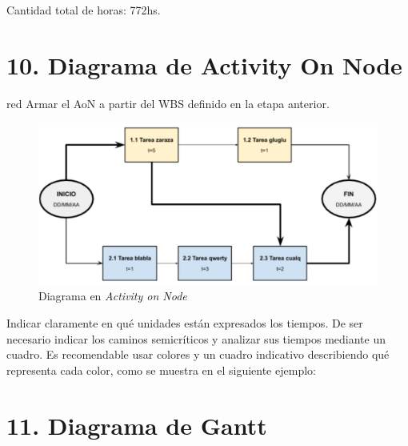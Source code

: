 \documentclass[
11pt, %
]{charter}
\begin{document}
Cantidad total de horas: 772hs.

\section{10. Diagrama de Activity On Node}
\label{sec:AoN}

\begin{consigna}{red}
Armar el AoN a partir del WBS definido en la etapa anterior. 



\end{consigna}

\begin{figure}[htpb]
\centering 
\includegraphics[width=.8\textwidth]{./Figuras/AoN.png}
\caption{Diagrama en \textit{Activity on Node}}
\label{fig:AoN}
\end{figure}

Indicar claramente en qué unidades están expresados los tiempos.
De ser necesario indicar los caminos semicríticos y analizar sus tiempos mediante un cuadro.
Es recomendable usar colores y un cuadro indicativo describiendo qué representa cada color, como se muestra en el siguiente ejemplo:



\section{11. Diagrama de Gantt}
\label{sec:gantt}
\end{document}

